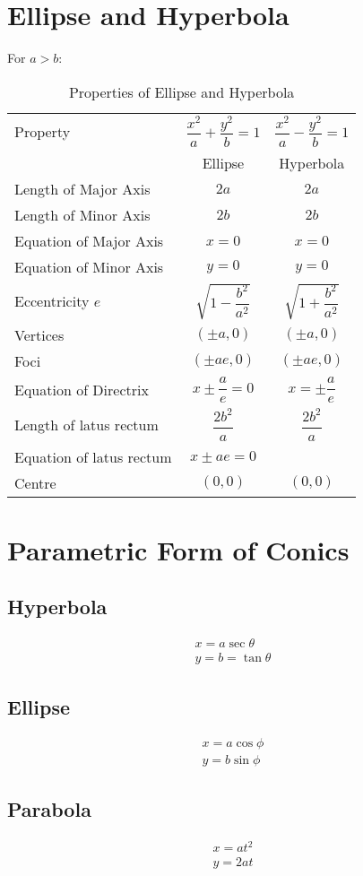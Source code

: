 \documentclass[../main.tex]{subfile}
\begin{document}
    \section{Ellipse and Hyperbola}
    For $a>b$:
    \begin{table}[h!]
        \begin{center}
            \caption{Properties of Ellipse and Hyperbola}
            \label{ell&hyp}
            \begin{tabular}{l|c|c}
                Property&$\dfrac{x^2}{a}+\dfrac{y^2}{b}=1$&$\dfrac{x^2}{a}-\dfrac{y^2}{b}=1$\\
                &Ellipse&Hyperbola\\
                \hline
                Length of Major Axis&$2a$&$2a$\\
                Length of Minor Axis&$2b$&$2b$\\
                Equation of Major Axis&$x=0$&$x=0$\\
                Equation of Minor Axis&$y=0$&$y=0$\\
                Eccentricity $e$&$\sqrt{1-\dfrac{b^2}{a^2}}$&$\sqrt{1+\dfrac{b^2}{a^2}}$\\
                Vertices&$(\pm a,0)$&$(\pm a,0)$\\
                Foci&$(\pm ae,0)$&$(\pm ae,0)$\\
                Equation of Directrix&$x \pm \dfrac{a}{e}=0$ &$x=\pm\dfrac{a}{e}$\\
                Length of latus rectum&$\dfrac{2b^2}{a}$&$\dfrac{2b^2}{a}$\\
                Equation of latus rectum&$x \pm ae=0$& \\
                Centre&$(0,0)$&$(0,0)$
            \end{tabular}
        \end{center}
    \end{table}

    
    \section{Parametric Form of Conics}
    \subsection{Hyperbola}
    \begin{align}
        x=a\sec \theta\\
        y=b=\tan \theta
    \end{align}

    \subsection{Ellipse}
    \begin{align}
        x=a\cos\phi\\
        y=b\sin\phi
        \end{align}
        \subsection{Parabola}
        \begin{align}
        x=at^2\\
        y=2at
    \end{align}
\end{document}
